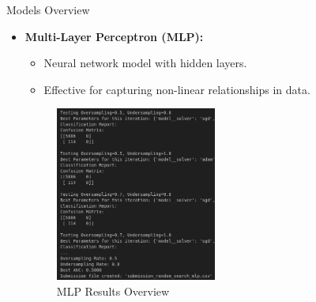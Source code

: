 \documentclass{beamer}
\begin{document}
\begin{frame}{Models Overview}
    \begin{itemize}
        \item \textbf{Multi-Layer Perceptron (MLP):}
        \begin{itemize}
            \item Neural network model with hidden layers.
            \item Effective for capturing non-linear relationships in data.
        \end{itemize}
    \begin{figure}
        \centering
        \includegraphics[width=0.5\textwidth]{images/mlp.png} %
        \caption{MLP Results Overview}
    \end{figure}
    \end{itemize}
\end{frame}
\end{document}

